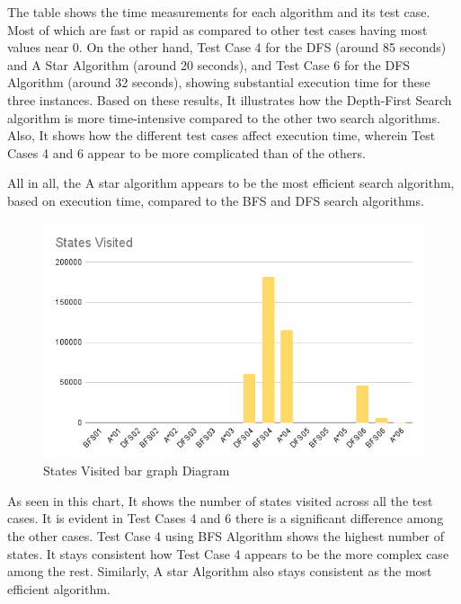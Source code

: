 \documentclass[journal]{./IEEE/IEEEtran}
\begin{document}
The table shows the time measurements for each algorithm and its test case. Most of which are fast or 
rapid as compared to other test cases having most values near 0. On the other hand, Test Case 4 for the 
DFS (around 85 seconds) and A Star Algorithm (around 20 seconds), and Test Case 6  for the DFS Algorithm (around 32 seconds), 
showing substantial execution time for these three instances. Based on these results, It illustrates how the Depth-First 
Search algorithm is more time-intensive compared to the other two search algorithms. Also, It shows how the 
different test cases affect execution time, wherein Test Cases 4 and 6 appear to be more complicated than of the others. 

All in all, the A star algorithm appears to be the most efficient search algorithm, based on execution 
time, compared to the BFS and DFS search algorithms.

\begin{figure}[H]
    \centering
    \includegraphics[width=1\linewidth]{pictures-Elisha/States Visited (1).png}
    \caption{States Visited bar graph Diagram}
    \label{fig:states_visited_bar_graph}
\end{figure}

As seen in this chart, It shows the number of states visited across all the test cases. 
It is evident in Test Cases 4 and 6 there is a significant difference among the other cases. 
Test Case 4 using BFS Algorithm shows the highest number of states. It stays consistent how Test Case 
4 appears to be the more complex case among the rest. Similarly, A star Algorithm also stays 
consistent as the most efficient algorithm.
\end{document}
